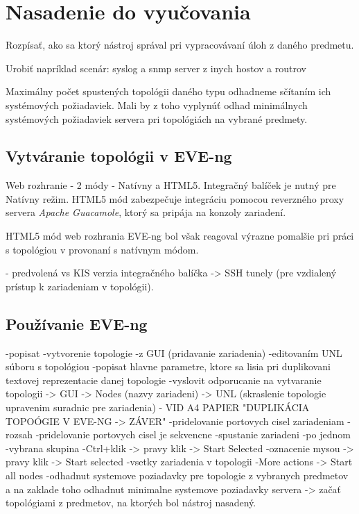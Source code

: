 \chapter{Nasadenie do vyučovania}
\label{chap:nasadenie_do_vyucovania}

Rozpísať, ako sa ktorý nástroj správal pri vypracovávaní úloh z daného predmetu.

Urobiť napríklad scenár: syslog a snmp server z inych hostov a routrov

Maximálny počet spustených topológii daného typu odhadneme sčítaním ich systémových požiadaviek. Mali by z toho vyplynúť odhad minimálnych systémových požiadaviek servera pri topológiách na vybrané predmety.




\section{Vytváranie topológii v EVE-ng}
\label{chap:nasadenie_klient}

Web rozhranie - 2 módy - Natívny a HTML5.
Integračný balíček je nutný pre Natívny režim. HTML5 mód zabezpečuje integráciu pomocou reverzného proxy servera \emph{Apache Guacamole}, ktorý sa pripája na konzoly zariadení.

HTML5 mód web rozhrania EVE-ng bol však reagoval výrazne pomalšie pri práci s topológiou v provonaní s natívnym módom.

- predvolená vs KIS verzia integračného balíčka -> SSH tunely (pre vzdialený prístup k zariadeniam v topológii).




\section{Používanie EVE-ng}

-popisat
      -vytvorenie topologie
        -z GUI (pridavanie zariadenia)
        -editovaním UNL súboru s topológiou
            -popisat hlavne parametre, ktore sa lisia pri duplikovani textovej reprezentacie danej topologie
        -vyslovit odporucanie na vytvaranie topologii
            -> GUI -> Nodes (nazvy zariadeni) -> UNL (skraslenie topologie upravenim suradnic pre zariadenia) - VID A4 PAPIER "DUPLIKÁCIA TOPOÓGIE V EVE-NG -> ZÁVER"
      -pridelovanie portovych cisel zariadeniam
        -rozsah
        -pridelovanie portovych cisel je sekvencne
      -spustanie zariadeni
        -po jednom
        -vybrana skupina
          -Ctrl+klik -> pravy klik -> Start Selected
          -oznacenie mysou -> pravy klik -> Start selected
        -vsetky zariadenia v topologii
          -More actions -> Start all nodes
      -odhadnut systemove poziadavky pre topologie z vybranych predmetov a na zaklade toho odhadnut minimalne systemove poziadavky servera
      -> začať topológiami z predmetov, na ktorých bol nástroj nasadený.




